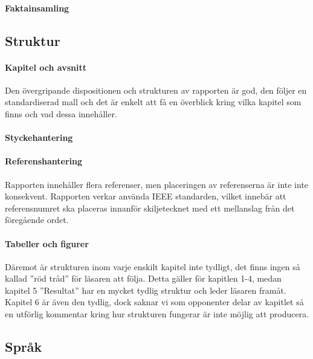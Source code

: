     \paragraph{Faktainsamling}


    \subsection{Struktur} %
    \label{sub:sturktur}
    \paragraph{Kapitel och avsnitt}
        Den övergripande dispositionen och strukturen av rapporten är god, den följer en standardiserad mall och det är enkelt att få en överblick kring vilka kapitel som finns och vad dessa innehåller. \bigskip
     
    \paragraph{Styckehantering}

    \paragraph{Referenshantering}
         Rapporten innehåller flera referenser, men placeringen av referenserna är inte inte konsekvent. Rapporten verkar använda IEEE standarden, vilket innebär att referensnumret ska placeras innanför skiljetecknet med ett mellanslag från det föregående ordet.
    
    \paragraph{Tabeller och figurer}

    
        Däremot är strukturen inom varje enskilt kapitel inte tydligt, det finns ingen så kallad ''röd tråd'' för läsaren att följa. Detta gäller för kapitlen 1-4, medan kapitel 5 ''Resultat'' har en mycket tydlig struktur och leder läsaren framåt. Kapitel 6 är även den tydlig, dock saknar vi som opponenter delar av kapitlet så en utförlig kommentar kring hur strukturen fungerar är inte möjlig att producera.


    \subsection{Språk} %
    \label{sub:sprak}

